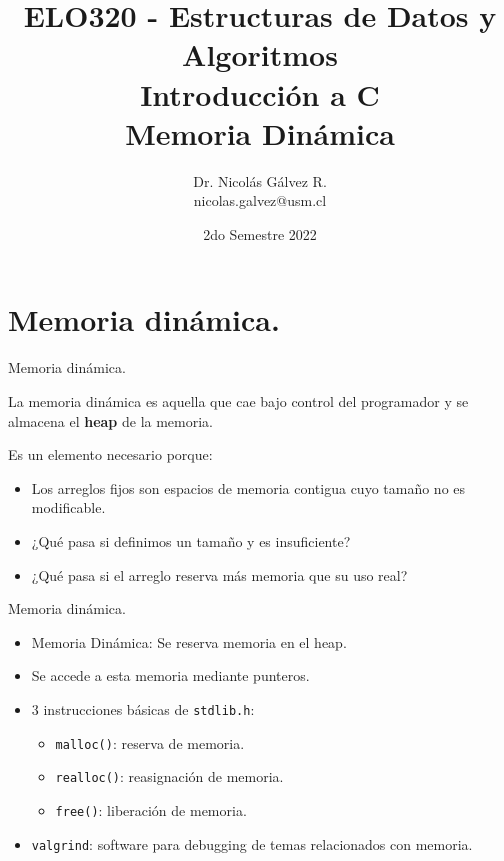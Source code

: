 \documentclass{beamer}
\title{ELO320 - Estructuras de Datos y Algoritmos\\Introducción a C\\Memoria Dinámica}
\author{Dr. Nicolás Gálvez R.\\{\small nicolas.galvez@usm.cl}}
\institute{Ing. Civil Telemática - Departamento de Electrónica}
\date{2do Semestre 2022}
\begin{document}
\frame{\titlepage}

%
%

\section{Memoria dinámica.}
\begin{frame}[fragile]{Memoria dinámica.}

La memoria dinámica es aquella que cae bajo control del programador y se almacena el \textbf{heap} de la memoria. 

Es un elemento necesario porque:
\begin{itemize}
\item Los arreglos fijos son espacios de memoria contigua cuyo tamaño no es modificable.
\item ¿Qué pasa si definimos un tamaño y es insuficiente?
\item ¿Qué pasa si el arreglo reserva más memoria que su uso real?
\end{itemize}
\end{frame}

\begin{frame}[fragile]{Memoria dinámica.}
\begin{itemize}
\item Memoria Dinámica: Se reserva memoria en el heap. 
\item Se accede a esta memoria mediante punteros.
\item 3 instrucciones básicas de \texttt{stdlib.h}:
\begin{itemize}
\item \texttt{malloc()}: reserva de memoria.
\item \texttt{realloc()}: reasignación de memoria.
\item \texttt{free()}: liberación de memoria.
\end{itemize}
\item \texttt{valgrind}: software para debugging de temas relacionados con memoria.
\end{itemize}
\end{frame}
\end{document}
